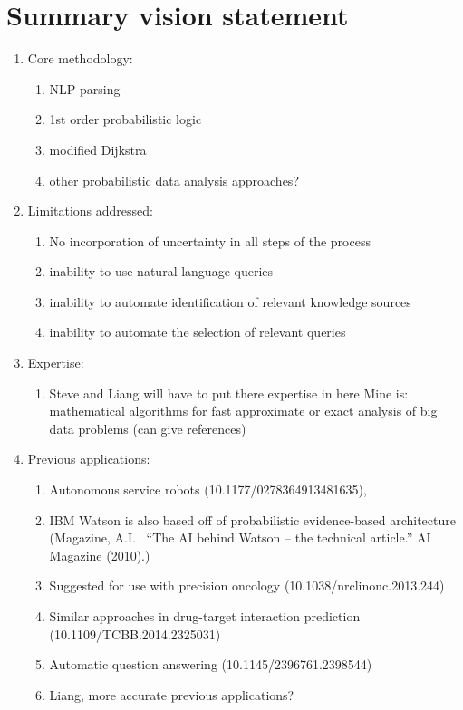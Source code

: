 \documentclass[11pt,notitlepage]{article}
\begin{document}
\thispagestyle{plain}

\section{Summary vision statement}
\begin{enumerate}
 \item Core methodology:
        \begin{enumerate}
        \item  NLP parsing
        \item  1st order probabilistic logic
        \item modified Dijkstra
        \item other probabilistic data analysis approaches?
  		\end{enumerate}
 \item Limitations addressed:
        \begin{enumerate}
        \item No incorporation of uncertainty in all steps of the process
        \item inability to use natural language queries
        \item inability to automate identification of relevant knowledge sources
        \item inability to automate the selection of relevant queries
        \end{enumerate}
 \item Expertise:
 		\begin{enumerate}
        \item Steve and Liang will have to put there expertise in here
        Mine is: mathematical algorithms for fast approximate or exact analysis of big data problems (can give references)
        \end{enumerate}
 \item Previous applications:
 		\begin{enumerate}
        \item Autonomous service robots (10.1177/0278364913481635),
        \item IBM Watson is also based off of probabilistic evidence-based architecture (Magazine, A.I.~ ``The AI behind Watson -- the technical article.'' AI Magazine (2010).)
        \item Suggested for use with precision oncology (10.1038/nrclinonc.2013.244)
        \item Similar approaches in drug-target interaction prediction (10.1109/TCBB.2014.2325031)
        \item Automatic question answering (10.1145/2396761.2398544)
        \item Liang, more accurate previous applications?
        \end{enumerate}
\end{enumerate}
\end{document}
